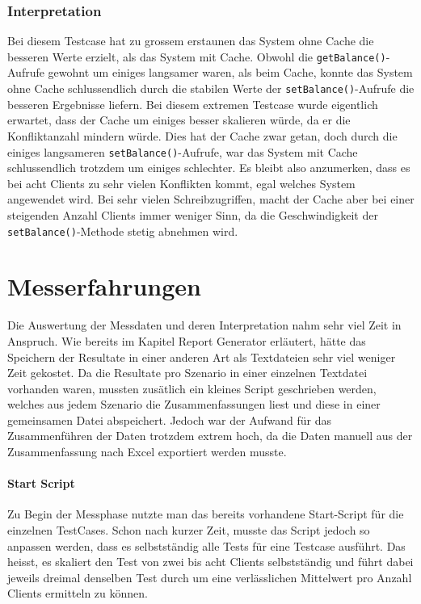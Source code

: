 \subsubsection{Interpretation}

Bei diesem Testcase hat zu grossem erstaunen das System ohne Cache die besseren Werte erzielt, als das System mit Cache. Obwohl die \texttt{getBalance()}-Aufrufe gewohnt um einiges langsamer waren, als beim Cache, konnte das System ohne Cache schlussendlich durch die stabilen Werte der \texttt{setBalance()}-Aufrufe die besseren Ergebnisse liefern.\newline
 Bei diesem extremen Testcase wurde eigentlich erwartet, dass der Cache um einiges besser skalieren würde, da er die Konfliktanzahl mindern würde. Dies hat der Cache zwar getan, doch durch die einiges langsameren \texttt{setBalance()}-Aufrufe, war das System mit Cache schlussendlich trotzdem um einiges schlechter. \newline
Es bleibt also anzumerken, dass es bei acht Clients zu sehr vielen Konflikten kommt, egal welches System angewendet wird. Bei sehr vielen Schreibzugriffen, macht der Cache aber bei einer steigenden Anzahl Clients immer weniger Sinn, da die Geschwindigkeit der  \texttt{setBalance()}-Methode stetig abnehmen wird.

\section{Messerfahrungen}
Die Auswertung der Messdaten und deren Interpretation nahm sehr viel Zeit in Anspruch. Wie bereits im Kapitel Report Generator erläutert, hätte das Speichern der Resultate in einer anderen Art als Textdateien sehr viel weniger Zeit gekostet. Da die Resultate pro Szenario in einer einzelnen Textdatei vorhanden waren, mussten zusätlich ein kleines Script geschrieben werden, welches  aus jedem Szenario die Zusammenfassungen liest und diese in einer gemeinsamen Datei abspeichert. Jedoch war der Aufwand für das Zusammenführen der Daten trotzdem extrem hoch, da die Daten manuell aus der Zusammenfassung nach Excel exportiert werden musste. 

\paragraph{Start Script}
Zu Begin der Messphase nutzte man das bereits vorhandene Start-Script für die einzelnen TestCases. Schon nach kurzer Zeit, musste das Script jedoch so anpassen werden, dass es selbstständig alle Tests für eine Testcase ausführt. Das heisst, es skaliert den Test von zwei bis acht Clients selbstständig und führt dabei jeweils dreimal denselben Test durch um eine verlässlichen Mittelwert pro Anzahl Clients ermitteln zu können.

